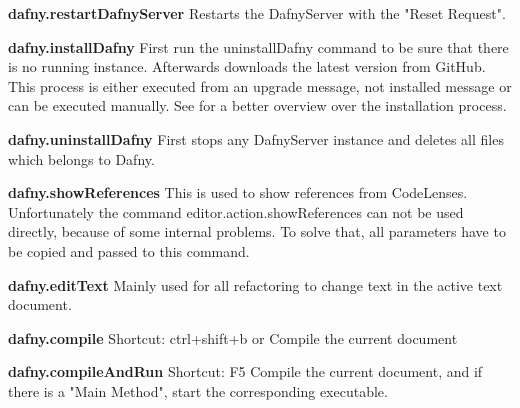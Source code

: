 \textbf{dafny.restartDafnyServer}
Restarts the DafnyServer with the "Reset Request".\newline

\textbf{dafny.installDafny}
First run the uninstallDafny command to be sure that there is no running instance. Afterwards downloads the latest version from GitHub. This process is either executed from an upgrade message, not installed message or can be executed manually. 
See  for a better overview over the installation process. \newline

\textbf{dafny.uninstallDafny}
First stops any DafnyServer instance and deletes all files which belongs to Dafny. \newline

\textbf{dafny.showReferences}
This is used to show references from CodeLenses. Unfortunately the command editor.action.showReferences can not be used directly, because of some internal problems. To solve that, all parameters have to be copied and passed to this command. \newline

\textbf{dafny.editText}
Mainly used for all refactoring to change text in the active text document. \newline

\textbf{dafny.compile}
Shortcut: ctrl+shift+b or %
\newline
Compile the current document \newline

\textbf{dafny.compileAndRun}
Shortcut: F5
\newline
Compile the current document, and if there is a "Main Method", start the corresponding executable. \newline


